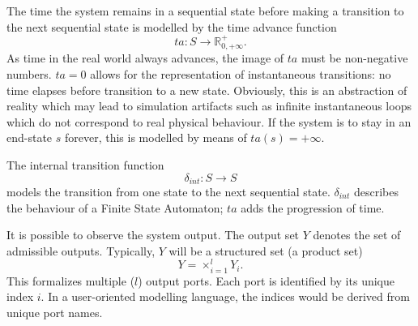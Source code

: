 The time the system remains in a sequential state before making a transition to the next sequential state is modelled by 
the time advance function
\begin{equation}
    ta: S \rightarrow \mathbb{R}^+_{0, + \infty}.
\end{equation}
As time in the real world always advances, the image of $ta$ must be non-negative numbers. $ta = 0$ allows for the 
representation of instantaneous transitions: no time elapses before transition to a new state. Obviously, this is an 
abstraction of reality which may lead to simulation artifacts such as infinite instantaneous loops which do not correspond 
to real physical behaviour. If the system is to stay in an end-state $s$ forever, this is modelled by means of $ta(s) = +\infty$.

The internal transition function
\begin{equation}
    \delta_{int}: S \rightarrow S
\end{equation}
models the transition from one state to the next sequential state. $\delta_{int}$ describes the behaviour of a Finite State 
Automaton; $ta$ adds the progression of time.

It is possible to observe the system output. The output set $Y$ denotes the set of admissible outputs. Typically, $Y$ will be a 
structured set (a product set)
\begin{equation}
    Y = \times_{i=1}^l Y_i.
\end{equation}
This formalizes multiple ($l$) output ports. Each port is identified by its unique index $i$. In a user-oriented modelling 
language, the indices would be derived from unique port names. 

